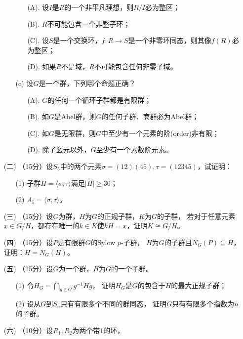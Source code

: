 \begin{itemize}
\begin{itemize}
        \begin{itemize}
            \item[(A).]设$I$是$R$的一个非平凡理想，则$R/I$必为整区；
            \item[(B).]$R$不可能包含一个非整子环；
            \item[(C).]设$S$是一个交换环，$f:R\to S$是一个非零环同态，则其像$f(R)$必为整区；
            \item[(D).]如果$R$不是域，$R$不可能包含任何非零子域。
        \end{itemize}
        \item[(e)]设$G$是一个群，下列哪个命题$\textbf{正确}$？
        \begin{itemize}
            \item[(A).]$G$的任何一个循环子群都是有限群；
            \item[(B).]如$G$是Abel群，则$G$的任何子群、商群必为Abel群；
            \item[(C).]如$G$是无限群，则$G$中至少有一个元素的阶(order)非有限；
            \item[(D).]除了幺元以外，$G$至少有一个素数阶元素。
        \end{itemize}
    \end{itemize}
    \item[(二)]（15分）设$S_5$中的两个元素$\sigma=(12)(45),\tau=(12345)$，试证明：
    \begin{itemize}
        \item[(1)]子群$H=\langle\sigma,\tau\rangle$满足$|H|\geq30$；
        \item[(2)]$A_5=\langle\sigma,\tau\rangle$。
    \end{itemize}
    \item[(三)]（15分）设$G$为群，$H$为$G$的正规子群，$K$为$G$的子群，
    若对于任意元素$x\in G/H$，都存在唯一的$k\in K$使$kH=x$，证明$K\cong G/H$。
    \item[(四)]（15分）设$P$是有限群$G$的Sylow $p$-子群，
    $H$为$G$的子群且$N_G(P)\subseteq H$，证明：$H=N_G(H)$。
    \item[(五)]（15分）设$G$为一个群，$H$为$G$的一个子群。
    \begin{itemize}
        \item[(1)]令$H_G=\bigcap_{g\in G}g^{-1}Hg$，
        证明$H_G$是$G$的包含于$H$的最大正规子群；
        \item[(2)]设从$G$到$S_n$只有有限多个不同的群同态，
        证明$G$只有有限多个指数为$n$的子群。
    \end{itemize}
    \item[(六)]（10分）设$R_1,R_2$为两个带$1$的环，

\end{itemize}
